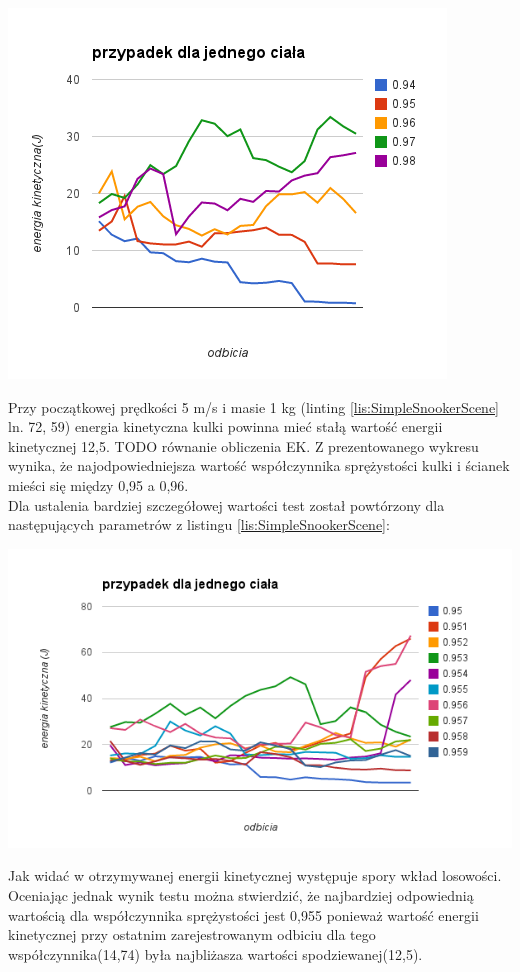 \includegraphics{./img/chart_2.png}

Przy początkowej prędkości 5 m/s i masie 1 kg (linting
\ref{lis:SimpleSnookerScene} ln. 72, 59) energia kinetyczna kulki powinna mieć
stałą wartość energii kinetycznej 12,5.
TODO równanie obliczenia EK.
Z prezentowanego wykresu wynika, że najodpowiedniejsza wartość współczynnika
sprężystości kulki i ścianek mieści się między 0,95 a 0,96.\\
Dla ustalenia bardziej szczegółowej wartości test został powtórzony dla
następujących parametrów z listingu \ref{lis:SimpleSnookerScene}:


  
\includegraphics[width=\textwidth]{./img/chart_3.png}

Jak widać w otrzymywanej energii kinetycznej występuje spory wkład losowości.
Oceniając jednak wynik testu można stwierdzić, że najbardziej odpowiednią
wartością dla współczynnika sprężystości jest 0,955 ponieważ wartość energii
kinetycznej przy ostatnim zarejestrowanym odbiciu dla tego współczynnika(14,74)
była najbliżasza wartości spodziewanej(12,5).